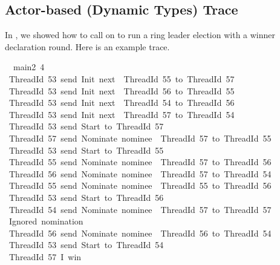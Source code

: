 \documentclass[sigplan,screen]{acmart}
\begin{document}
\subsection{Actor-based (Dynamic Types) Trace}
\label{apx:main2-trace}

In , we showed how to call  on
 to run a ring leader election with a winner declaration round.
%
Here is an example trace.

\scriptsize

\begin{tabbing}\ttfamily
~~main2~4\\
\ttfamily ~ThreadId~53~send~Init~next~~ThreadId~55~to~ThreadId~57\\
\ttfamily ~ThreadId~53~send~Init~next~~ThreadId~56~to~ThreadId~55\\
\ttfamily ~ThreadId~53~send~Init~next~~ThreadId~54~to~ThreadId~56\\
\ttfamily ~ThreadId~53~send~Init~next~~ThreadId~57~to~ThreadId~54\\
\ttfamily ~ThreadId~53~send~Start~to~ThreadId~57\\
\ttfamily ~ThreadId~57~send~Nominate~nominee~~ThreadId~57~to~ThreadId~55\\
\ttfamily ~ThreadId~53~send~Start~to~ThreadId~55\\
\ttfamily ~ThreadId~55~send~Nominate~nominee~~ThreadId~57~to~ThreadId~56\\
\ttfamily ~ThreadId~56~send~Nominate~nominee~~ThreadId~57~to~ThreadId~54\\
\ttfamily ~ThreadId~55~send~Nominate~nominee~~ThreadId~55~to~ThreadId~56\\
\ttfamily ~ThreadId~53~send~Start~to~ThreadId~56\\
\ttfamily ~ThreadId~54~send~Nominate~nominee~~ThreadId~57~to~ThreadId~57\\
\ttfamily ~Ignored~nomination\\
\ttfamily ~ThreadId~56~send~Nominate~nominee~~ThreadId~56~to~ThreadId~54\\
\ttfamily ~ThreadId~53~send~Start~to~ThreadId~54\\
\ttfamily ~ThreadId~57~I~win\\

\end{tabbing}
\end{document}
